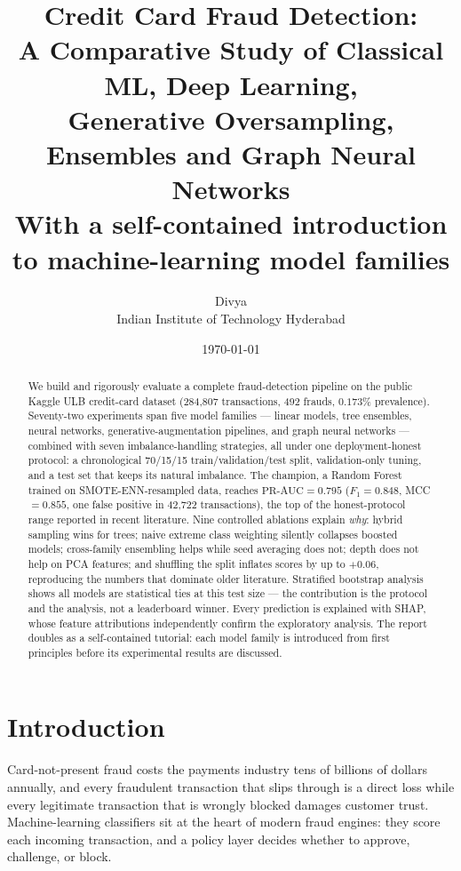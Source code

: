 \documentclass[11pt,a4paper]{article}
\title{\vspace{-1.2cm}\textbf{Credit Card Fraud Detection:\\
A Comparative Study of Classical ML, Deep Learning,\\ Generative Oversampling, Ensembles and Graph Neural Networks}\\[0.4cm]
\large With a self-contained introduction to machine-learning model families\\[0.6cm]}
\author{Divya \\ Indian Institute of Technology Hyderabad}
\date{\today}
\begin{document}
\maketitle

\begin{abstract}
\noindent
We build and rigorously evaluate a complete fraud-detection pipeline on the public Kaggle ULB
credit-card dataset (284{,}807 transactions, 492 frauds, $0.173\%$ prevalence).
Seventy-two experiments span five model families --- linear models, tree ensembles,
neural networks, generative-augmentation pipelines, and graph neural networks --- combined with
seven imbalance-handling strategies, all under one deployment-honest protocol:
a chronological 70/15/15 train/validation/test split, validation-only tuning,
and a test set that keeps its natural imbalance.
The champion, a Random Forest trained on SMOTE-ENN-resampled data, reaches
$\text{PR-AUC} = 0.795$ ($F_1 = 0.848$, MCC $= 0.855$, one false positive in 42{,}722 transactions),
the top of the honest-protocol range reported in recent literature.
Nine controlled ablations explain \emph{why}: hybrid sampling wins for trees;
naive extreme class weighting silently collapses boosted models; cross-family
ensembling helps while seed averaging does not; depth does not help on PCA features;
and shuffling the split inflates scores by up to $+0.06$, reproducing the numbers
that dominate older literature. Stratified bootstrap analysis shows all models are
statistical ties at this test size --- the contribution is the protocol and the analysis,
not a leaderboard winner. Every prediction is explained with SHAP, whose feature
attributions independently confirm the exploratory analysis.
The report doubles as a self-contained tutorial: each model family is introduced from
first principles before its experimental results are discussed.
\end{abstract}

\newpage
\tableofcontents
\newpage

\section{Introduction}

Card-not-present fraud costs the payments industry tens of billions of dollars annually,
and every fraudulent transaction that slips through is a direct loss while every legitimate
transaction that is wrongly blocked damages customer trust. Machine-learning classifiers sit
at the heart of modern fraud engines: they score each incoming transaction, and a policy layer
decides whether to approve, challenge, or block.
\end{document}
